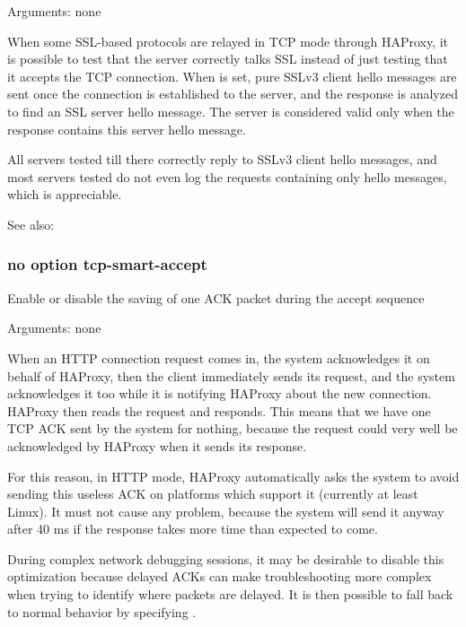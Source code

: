 
  Arguments: none

  When some SSL-based protocols are relayed in TCP mode through HAProxy, it is
  possible to test that the server correctly talks SSL instead of just testing
  that it accepts the TCP connection. When  is set, pure
  SSLv3 client hello messages are sent once the connection is established to
  the server, and the response is analyzed to find an SSL server hello message.
  The server is considered valid only when the response contains this server
  hello message.

  All servers tested till there correctly reply to SSLv3 client hello messages,
  and most servers tested do not even log the requests containing only hello
  messages, which is appreciable.


See also: 

\subsubsection[tcp-smart-accept]{}
\subsubsection*{no option tcp-smart-accept}


  Enable or disable the saving of one ACK packet during the accept sequence


  Arguments: none

  When an HTTP connection request comes in, the system acknowledges it on
  behalf of HAProxy, then the client immediately sends its request, and the
  system acknowledges it too while it is notifying HAProxy about the new
  connection. HAProxy then reads the request and responds. This means that we
  have one TCP ACK sent by the system for nothing, because the request could
  very well be acknowledged by HAProxy when it sends its response.

  For this reason, in HTTP mode, HAProxy automatically asks the system to avoid
  sending this useless ACK on platforms which support it (currently at least
  Linux). It must not cause any problem, because the system will send it anyway
  after 40 ms if the response takes more time than expected to come.

  During complex network debugging sessions, it may be desirable to disable
  this optimization because delayed ACKs can make troubleshooting more complex
  when trying to identify where packets are delayed. It is then possible to
  fall back to normal behavior by specifying .

